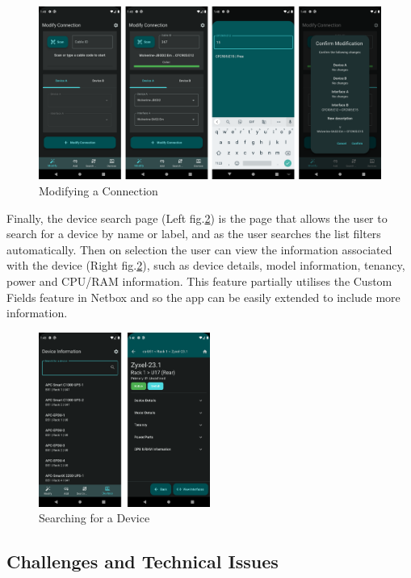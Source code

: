 \documentclass [11pt,a4paper]{article}
\begin{document}
\begin{figure}[H]
    \centering
    \includegraphics[width=\textwidth]{images/final_modify.png}
    \caption{Modifying a Connection}
    \label{fig:modify_connection}
\end{figure}

Finally, the device search page (Left fig.\ref{fig:device_searhc_and_view}) is the page that allows the user to search for a device by name or label, and as the user searches the list filters automatically. Then on selection the user can view the information associated with the device (Right fig.\ref{fig:device_searhc_and_view}), such as device details, model information, tenancy, power and CPU/RAM information. This feature partially utilises the Custom Fields feature in Netbox and so the app can be easily extended to include more information.

\begin{figure}[H]
    \centering
    \includegraphics[width=0.5\textwidth]{images/final_device.png}
    \caption{Searching for a Device}
    \label{fig:device_searhc_and_view}
\end{figure}

\subsection{Challenges and Technical Issues}
\label{sec:challenges}
\end{document}
